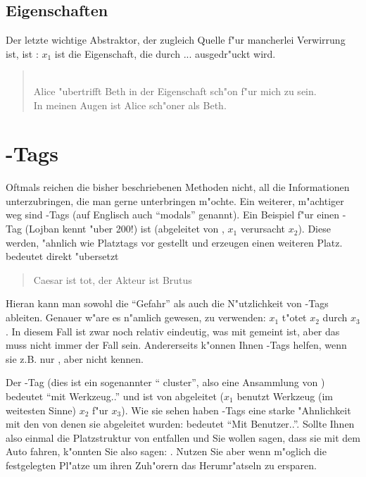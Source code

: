 \subsection{Eigenschaften}
Der letzte wichtige Abstraktor, der zugleich Quelle f"ur mancherlei Verwirrung ist, ist : $x_1$ ist die Eigenschaft, die durch ...
ausgedr"uckt wird.
\begin{quote}
 \\
Alice "ubertrifft Beth in der Eigenschaft sch"on f"ur mich zu sein. \\
In meinen Augen ist Alice sch"oner als Beth.
\end{quote}



\section{-Tags}
Oftmals reichen die bisher beschriebenen Methoden nicht, all die Informationen unterzubringen, die man gerne unterbringen m"ochte. Ein weiterer,
m"achtiger weg sind -Tags (auf Englisch auch ``modals'' genannt). Ein Beispiel f"ur einen -Tag (Lojban kennt "uber 200!) ist
 (abgeleitet von , $x_1$ verursacht $x_2$). Diese  werden, "ahnlich wie Platztags vor  gestellt
und erzeugen einen weiteren Platz.  bedeutet direkt "ubersetzt
\begin{quote}
Caesar ist tot, der Akteur ist Brutus
\end{quote}
Hieran kann man sowohl die ``Gefahr'' als auch die N"utzlichkeit von -Tags ableiten. Genauer w"are es n"amlich gewesen,  zu
verwenden: $x_1$ t"otet $x_2$ durch $x_3$. In diesem Fall ist zwar noch relativ eindeutig, was mit  gemeint ist, aber das muss nicht
immer der Fall sein. Andererseits k"onnen Ihnen -Tags helfen, wenn sie z.B. nur , aber nicht  kennen.

Der -Tag  (dies ist ein sogenannter `` cluster'', also eine Ansammlung von ) bedeutet ``mit Werkzeug..'' und ist von  abgeleitet ($x_1$ benutzt Werkzeug (im weitesten Sinne) $x_2$ f"ur $x_3$). Wie sie sehen haben -Tags
eine starke "Ahnlichkeit mit den  von denen sie abgeleitet wurden:  bedeutet ``Mit Benutzer..''.
Sollte Ihnen also einmal die Platzstruktur von  entfallen und Sie wollen sagen, dass sie mit dem Auto fahren, k"onnten Sie also sagen: .
Nutzen Sie aber wenn m"oglich die festgelegten Pl"atze um ihren Zuh"orern das Herumr"atseln zu ersparen.

